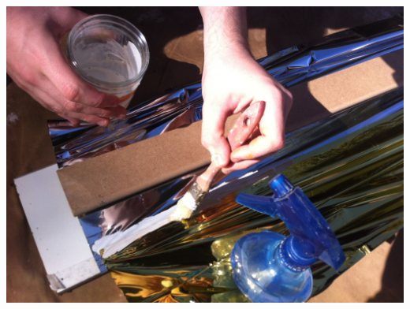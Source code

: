 \documentclass[a4paper,11pt]{article}
\begin{document}
\begin{center}
	\includegraphics[width=15cm]{../Images/assen_3.JPG}
\end{center}
\end{document}
